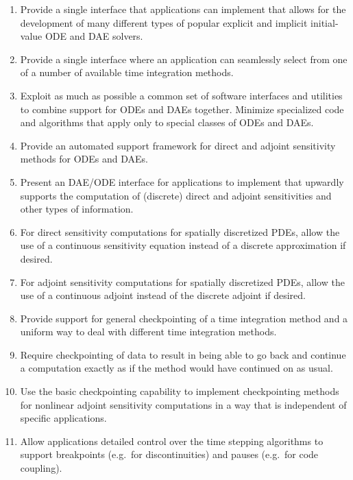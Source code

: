\documentclass[pdf,ps2pdf,11pt]{SANDreport}
\begin{document}
\begin{enumerate}

{}\item Provide a single interface that applications can implement that allows
for the development of many different types of popular explicit and implicit
initial-value ODE and DAE solvers.

{}\item Provide a single interface where an application can seamlessly select
from one of a number of available time integration methods.

{}\item Exploit as much as possible a common set of software interfaces and
utilities to combine support for ODEs and DAEs together.  Minimize specialized
code and algorithms that apply only to special classes of ODEs and DAEs.

{}\item Provide an automated support framework for direct and adjoint
sensitivity methods for ODEs and DAEs.

{}\item Present an DAE/ODE interface for applications to implement that
upwardly supports the computation of (discrete) direct and adjoint
sensitivities and other types of information.

{}\item For direct sensitivity computations for spatially discretized PDEs,
allow the use of a continuous sensitivity equation instead of a discrete
approximation if desired.

{}\item For adjoint sensitivity computations for spatially discretized PDEs,
allow the use of a continuous adjoint instead of the discrete adjoint if
desired.

{}\item Provide support for general checkpointing of a time integration method
and a uniform way to deal with different time integration methods.

{}\item Require checkpointing of data to result in being able to go back and
continue a computation exactly as if the method would have continued on as
usual.

{}\item Use the basic checkpointing capability to implement checkpointing
methods for nonlinear adjoint sensitivity computations in a way that is
independent of specific applications.

{}\item Allow applications detailed control over the time stepping algorithms
to support breakpoints (e.g.\ for discontinuities) and pauses (e.g.\ for code coupling). 


\end{enumerate}
\end{document}
